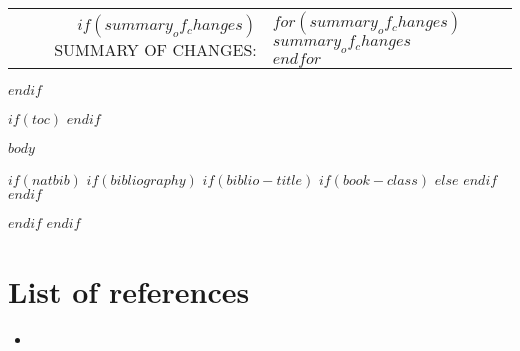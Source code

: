\documentclass[$if(fontsize)$$fontsize$,$endif$$if(lang)$$babel-lang$,$endif$$if(papersize)$$papersize$paper,$endif$$for(classoption)$$classoption$$sep$,$endfor$]{$documentclass$}
\begin{document}
\begin{minipage}{\textwidth}
\begin{center}
\begin{tabular}{ r l }
                $if(summary_of_changes)$
                {\color{gray}SUMMARY OF CHANGES:}           & \parbox[t]{8cm}{$for(summary_of_changes)$ $summary_of_changes$ \vspace{2mm} \\ $endfor$} \\

                \null & \null \\
                $endif$


            \end{tabular}
        \end{center}
    \end{minipage}
    \vfill
    \newpage
$endif$


\vspace*{1cm}

$if(toc)$
    {
        \hypersetup{linkcolor=$if(toccolor)$$toccolor$$else$black$endif$}
        \setcounter{tocdepth}{$toc-depth$}
        \tableofcontents
        \clearpage
        \newpage
    }
$endif$

\pagestyle{fancy}
$body$
\newpage

$if(natbib)$
    $if(bibliography)$
        $if(biblio-title)$
            $if(book-class)$
                \renewcommand\bibname{$biblio-title$}
            $else$
                \renewcommand\refname{$biblio-title$}
            $endif$
        $endif$
        
        \newpage
    $endif$
$endif$

\iftotalfigures{}\listoffigures\newpage\fi
\iftotaltables{}\listoftables\newpage\fi


	\section*{List of references}
	\begin{itemize}
			\item {} \\
	\end{itemize}
	\newpage
\end{document}
